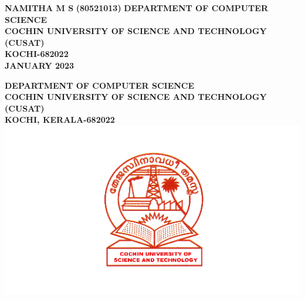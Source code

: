 \documentclass[a4paper,12pt]{report}
\begin{document}
\begin{center}
		\textbf{NAMITHA M S\hspace{600pt}}
		\vspace*{20pt}
		\textbf{(80521013) \hspace{300pt}}
		\vspace*{0pt}
		\small\textbf{DEPARTMENT OF COMPUTER SCIENCE\\}
		\small\textbf{COCHIN UNIVERSITY OF SCIENCE AND TECHNOLOGY (CUSAT)\\}
		\small\textbf{KOCHI-682022\\}
		\vspace{10pt}
		\small\textbf{JANUARY 2023}
		
		
		
	\end{center}
	\newpage
	\thispagestyle{empty}
	
	
	\begin{center}
		\large\textbf{DEPARTMENT OF COMPUTER SCIENCE\\}
		\small\textbf{COCHIN UNIVERSITY OF SCIENCE AND TECHNOLOGY (CUSAT)\\}
		\small\textbf{KOCHI, KERALA-682022\\}
		\vspace*{20pt}
		\includegraphics[scale=0.5]{cusat.png}
		\vspace*{20pt}
	\end{center}
	\vspace{15pt}
	
\end{document}
